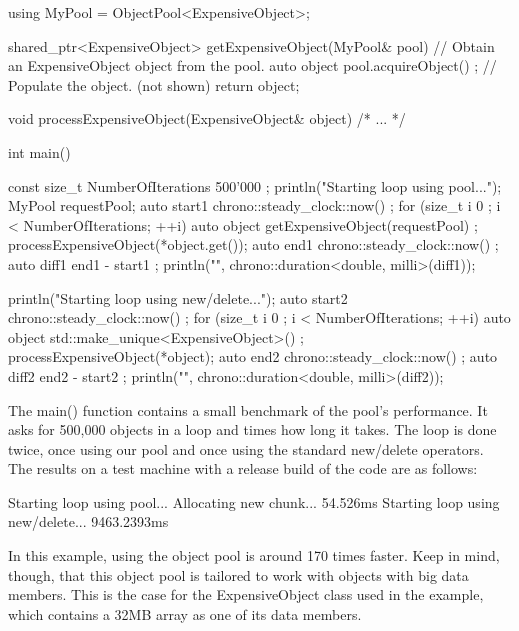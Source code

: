 \begin{cpp}
using MyPool = ObjectPool<ExpensiveObject>;

shared_ptr<ExpensiveObject> getExpensiveObject(MyPool& pool)
{
    // Obtain an ExpensiveObject object from the pool.
    auto object { pool.acquireObject() };
    // Populate the object. (not shown)
    return object;
}

void processExpensiveObject(ExpensiveObject& object) { /* ... */ }

int main()
{
    const size_t NumberOfIterations { 500'000 };
    println("Starting loop using pool...");
    MyPool requestPool;
    auto start1 { chrono::steady_clock::now() };
    for (size_t i { 0 }; i < NumberOfIterations; ++i) {
        auto object { getExpensiveObject(requestPool) };
        processExpensiveObject(*object.get());
    }
    auto end1 { chrono::steady_clock::now() };
    auto diff1 { end1 - start1 };
    println("{}", chrono::duration<double, milli>(diff1));


    println("Starting loop using new/delete...");
    auto start2 { chrono::steady_clock::now() };
    for (size_t i { 0 }; i < NumberOfIterations; ++i) {
        auto object { std::make_unique<ExpensiveObject>() };
        processExpensiveObject(*object);
    }
    auto end2 { chrono::steady_clock::now() };
    auto diff2 { end2 - start2 };
    println("{}", chrono::duration<double, milli>(diff2));
}
\end{cpp}

The main() function contains a small benchmark of the pool’s performance. It asks for 500,000 objects in a loop and times how long it takes. The loop is done twice, once using our pool and once using the standard new/delete operators. The results on a test machine with a release build of the code are as follows:

\begin{shell}
Starting loop using pool...
Allocating new chunk...
54.526ms
Starting loop using new/delete...
9463.2393ms
\end{shell}

In this example, using the object pool is around 170 times faster. Keep in mind, though, that this object pool is tailored to work with objects with big data members. This is the case for the ExpensiveObject class used in the example, which contains a 32MB array as one of its data members.
